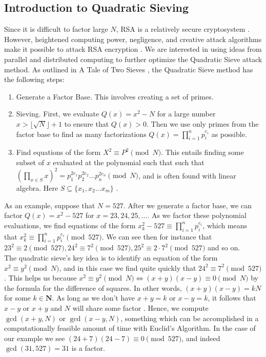 \documentclass[11pt,twocolumn]{article}
\begin{document}
\subsection{Introduction to Quadratic Sieving}
Since it is difficult to factor large $N$, RSA is a relatively secure cryptosystem \cite{hoffstein:cryptography}. However, heightened computing power, negligence, and creative attack algorithms make it possible to attack RSA encryption \cite{lifchitz:rsa_break}. We are interested in using ideas from parallel and distributed computing to further optimize the Quadratic Sieve attack method. As outlined in A Tale of Two Sieves \cite{pomerance:tts}, the Quadratic Sieve method has the following steps:

\begin{enumerate}
    \item Generate a Factor Base. This involves creating a set of primes.
    \item Sieving. First, we evaluate $Q(x) = x^2 - N$ for a large number $x > \lfloor \sqrt{N} \rfloor + 1$ to ensure that $Q(x) > 0$. Then we use only primes from the factor base to find as many factorizations $Q(x) = \displaystyle \prod_{i = 1}^n p_i^{e_i}$ as possible.
    \item Find equations of the form $X^2 \equiv P^2 \pmod{N}$. This entails finding some subset of $x$ evaluated at the polynomial such that such that $\left( \displaystyle \prod_{x \in S} x \right)^2 = p_1^{2e_1} p_2^{2e_2} \ldots p_n^{2e_n} \pmod{N}$, and is often found with linear algebra. Here $S \subseteq \{x_1, x_2 \ldots x_m \}$ \cite{landquist:qs}.
\end{enumerate}

\indent As an example, suppose that $N = 527$. After we generate a factor base, we can factor $Q(x) = x^2 - 527$ for $x = 23, 24, 25, ...$. As we factor these polynomial evaluations, we find equations of the form $x_k^2 - 527 \equiv \displaystyle \prod_{i = 1}^n p_i^{e_i}$, which means that $x_k^2 \equiv \displaystyle \prod_{i = 1}^n p_i^{e_i} \pmod{527}$. We can see then for instance that $23^2 \equiv 2 \pmod{527}, 24^2 \equiv 7^2 \pmod{527}, 25^2 \equiv 2 \cdot 7^2 \pmod{527}$ and so on. \\
The quadratic sieve's key idea is to identify an equation of the form $x^2 \equiv y^2 \pmod{N}$, and in this case we find quite quickly that $24^2 \equiv 7^2 \pmod{527}$. This helps us because $x^2 \equiv y^2 \pmod{N} \iff (x+y)(x-y) \equiv 0 \pmod{N}$ by the formula for the difference of squares.  In other words, $(x+y)(x-y) = kN$ for some $k \in \mathbf{N}$. As long as we don't have $x+y = k$ or $x-y = k$, it follows that $x-y$ or $x+y$ and $N$ will share some factor \cite{hoffstein:cryptography}. Hence, we compute  $\gcd(x+y, N)$ or $\gcd(x- y, N)$, something which can be accomplished in a computationally feasible amount of time with Euclid's Algorithm. In the case of our example we see $(24 + 7)(24 - 7) \equiv 0 \pmod{527}$, and indeed $\gcd(31, 527) = 31$ is a factor.
\end{document}
